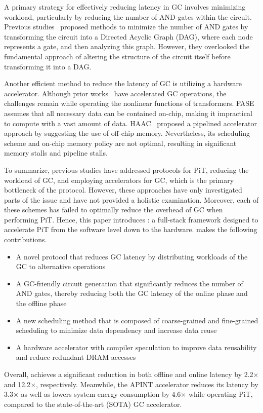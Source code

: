 A primary strategy for effectively reducing latency in GC involves minimizing workload, particularly by reducing the number of AND gates within the circuit. Previous studies~\cite{testa2019reducing, testa2020logic, liu2022don} proposed methods to minimize the number of AND gates by transforming the circuit into a Directed Acyclic Graph (DAG), where each node represents a gate, and then analyzing this graph. However, they overlooked the fundamental approach of altering the structure of the circuit itself before transforming it into a DAG.

Another efficient method to reduce the latency of GC is utilizing a hardware accelerator. Although prior works~\cite{hussain2019fase,mo2023haac} have accelerated GC operations, the challenges remain while operating the nonlinear functions of transformers. FASE~\cite{hussain2019fase} assumes that all necessary data can be contained on-chip, making it impractical to compute with a vast amount of data. HAAC~\cite{mo2023haac} proposed a pipelined accelerator approach by suggesting the use of off-chip memory. Nevertheless, its scheduling scheme and on-chip memory policy are not optimal, resulting in significant memory stalls and pipeline stalls.

To summarize, previous studies have addressed protocols for PiT, reducing the workload of GC, and employing accelerators for GC, which is the primary bottleneck of the protocol. However, these approaches have only investigated parts of the issue and have not provided a holistic examination. Moreover, each of these schemes has failed to optimally reduce the overhead of GC when performing PiT. Hence, this paper introduces \sysname: a full-stack framework designed to accelerate PiT from the software level down to the hardware. \sysname makes the following contributions.
\begin{itemize}[topsep=5pt]
    \item A novel protocol that reduces GC latency by distributing workloads of the GC to alternative operations
    \item A GC-friendly circuit generation that significantly reduces the number of AND gates, thereby reducing both the GC latency of the online phase and the offline phase
    \item A new scheduling method that is composed of coarse-grained and fine-grained scheduling to minimize data dependency and increase data reuse
    \item A hardware accelerator with compiler speculation to improve data reusability and reduce redundant DRAM accesses
\end{itemize}
Overall, \sysname achieves a significant reduction in both offline and online latency by 2.2$\times$ and 12.2$\times$, respectively. Meanwhile, the APINT accelerator reduces its latency by 3.3$\times$ as well as lowers system energy consumption by 4.6$\times$ while operating PiT, compared to the state-of-the-art (SOTA) GC accelerator.
